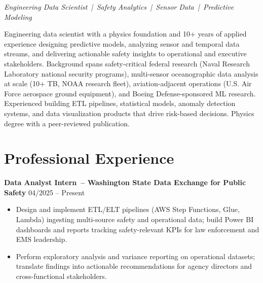 \documentclass[10pt,letterpaper]{moderncv}
\begin{document}
\makecvtitle

\vspace*{-9mm}
\begin{center}
\textit{Engineering Data Scientist~|~Safety Analytics~|~Sensor Data~|~Predictive Modeling}
\end{center}
\vspace*{1mm}

Engineering data scientist with a physics foundation and 10+ years of applied experience designing predictive models, analyzing sensor and temporal data streams, and delivering actionable safety insights to operational and executive stakeholders. Background spans safety-critical federal research (Naval Research Laboratory national security programs), multi-sensor oceanographic data analysis at scale (10+ TB, NOAA research fleet), aviation-adjacent operations (U.S. Air Force aerospace ground equipment), and Boeing Defense-sponsored ML research. Experienced building ETL pipelines, statistical models, anomaly detection systems, and data visualization products that drive risk-based decisions. Physics degree with a peer-reviewed publication.

\vspace*{2mm}
\section{Professional Experience}
\vspace*{1mm}

\textbf{Data Analyst Intern~-- Washington State Data Exchange for Public Safety} \hfill 04/2025 -- Present
\vspace*{-2mm}
\begin{itemize}[label={-}, itemsep=-1.0ex]
  \item Design and implement ETL/ELT pipelines (AWS Step Functions, Glue, Lambda) ingesting multi-source safety and operational data; build Power BI dashboards and reports tracking safety-relevant KPIs for law enforcement and EMS leadership.
  \item Perform exploratory analysis and variance reporting on operational datasets; translate findings into actionable recommendations for agency directors and cross-functional stakeholders.
\end{itemize}
\end{document}

